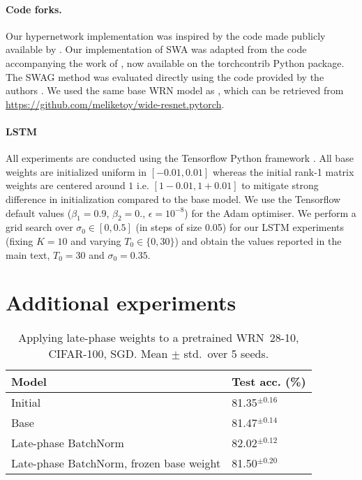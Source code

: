 \documentclass{article} \usepackage{iclr2021_conference,times}
\begin{document}
\paragraph{Code forks.}
Our hypernetwork implementation was inspired by the code made publicly available by \citet{savarese_learning_2019}. Our implementation of SWA was adapted from the code accompanying the work of \citet{izmailov_averaging_2018}, now available on the torchcontrib Python package. The SWAG method was evaluated directly using the code provided by the authors \citep{maddox_simple_2019}. We used the same base WRN model as \citet{maddox_simple_2019}, which can be retrieved from \url{https://github.com/meliketoy/wide-resnet.pytorch}.

\paragraph{LSTM}

All experiments are conducted using the Tensorflow Python framework \citep{abadi_tensorflow_2016}. All base weights are initialized uniform in $[-0.01,0.01]$ whereas the initial rank-1 matrix weights are centered around $1$ i.e. $[1-0.01,1 + 0.01]$ to mitigate strong difference in initialization compared to the base model. We use the Tensorflow default values ($\beta_1=0.9$, $\beta_2=0.$, $\epsilon=10^{-8}$) for the Adam optimiser. We perform a grid search over $\sigma_0 \in [0, 0.5]$ (in steps of size 0.05) for our LSTM experiments (fixing $K=10$ and varying $T_0 \in \{0, 30\}$) and obtain the values reported in the main text, $T_0=30$ and $\sigma_0=0.35$.

\section{Additional experiments}
\label{apx:extra-expt}
\begin{table}[h!]
\centering
  \caption{Applying late-phase weights to a pretrained WRN~28-10, CIFAR-100, SGD. Mean $\pm$ std.~over 5 seeds.}
  \label{tab:pretrained-c100}
  \vspace{-0.2cm}
  \centering
    \begin{tabular}{ll}
    \toprule
    Model    & Test acc. (\%) \\\midrule
    Initial &  81.35$^{\pm 0.16}$ \\
    Base &  81.47$^{\pm 0.14}$    \\
    Late-phase BatchNorm & 82.02$^{\pm 0.12}$ \\
    Late-phase BatchNorm, frozen base weight  &  81.50$^{\pm 0.20}$  \\\bottomrule  
    \end{tabular}
\end{table}
\end{document}
